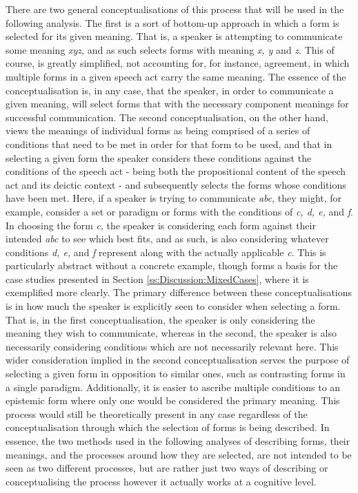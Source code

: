 There are two general conceptualisations of this process that will be used in the following analysis. The first is a sort of bottom-up approach in which a form is selected for its given meaning. That is, a speaker is attempting to communicate some meaning \textit{xyz}, and as such selects forms with meaning \textit{x, y} and \textit{z}. This of course, is greatly simplified, not accounting for, for instance, agreement, in which multiple forms in a given speech act carry the same meaning. The essence of the conceptualisation is, in any case, that the speaker, in order to communicate a given meaning, will select forms that with the necessary component meanings for successful communication. The second conceptualisation, on the other hand, views the meanings of individual forms as being comprised of a series of conditions that need to be met in order for that form to be used, and that in selecting a given form the speaker considers these conditions against the conditions of the speech act - being both the propositional content of the speech act and its deictic context - and subsequently selects the forms whose conditions have been met. Here, if a speaker is trying to communicate \textit{abc}, they might, for example, consider a set or paradigm or forms with the conditions of \textit{c, d, e,} and \textit{f}. In choosing the form \textit{c}, the speaker is considering each form against their intended \textit{abc} to see which best fits, and as such, is also considering whatever conditions \textit{d, e,} and \textit{f} represent along with the actually applicable \textit{c}. This is particularly abstract without a concrete example, though forms a basis for the case studies presented in Section \ref{ss:Discussion:MixedCases}, where it is exemplified more clearly. The primary difference between these conceptualisations is in how much the speaker is explicitly seen to consider when selecting a form. That is, in the first conceptualisation, the speaker is only considering the meaning they wish to communicate, whereas in the second, the speaker is also necessarily considering conditions which are not necessarily relevant here. This wider consideration implied in the second conceptualisation serves the purpose of selecting a given form in opposition to similar ones, such as contrasting forms in a single paradigm. Additionally, it is easier to ascribe multiple conditions to an epistemic form where only one would be considered the primary meaning. This process would still be theoretically present in any case regardless of the conceptualisation through which the selection of forms is being described. In essence, the two methods used in the following analyses of describing forms, their meanings, and the processes around how they are selected, are not intended to be seen as two different processes, but are rather just two ways of describing or conceptualising the process however it actually works at a cognitive level.

